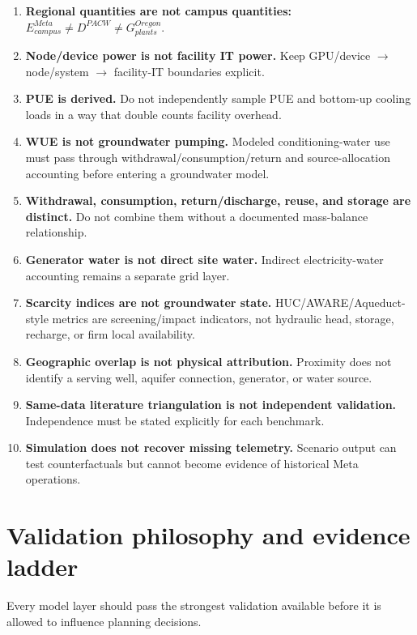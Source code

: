 \documentclass[11pt]{article}
\begin{document}
\begin{enumerate}
\item \textbf{Regional quantities are not campus quantities:}
$E^{Meta}_{campus}\neq D^{PACW}\neq G^{Oregon}_{plants}$.
\item \textbf{Node/device power is not facility IT power.} Keep GPU/device $\rightarrow$ node/system $\rightarrow$ facility-IT boundaries explicit.
\item \textbf{PUE is derived.} Do not independently sample PUE and bottom-up cooling loads in a way that double counts facility overhead.
\item \textbf{WUE is not groundwater pumping.} Modeled conditioning-water use must pass through withdrawal/consumption/return and source-allocation accounting before entering a groundwater model.
\item \textbf{Withdrawal, consumption, return/discharge, reuse, and storage are distinct.} Do not combine them without a documented mass-balance relationship.
\item \textbf{Generator water is not direct site water.} Indirect electricity-water accounting remains a separate grid layer.
\item \textbf{Scarcity indices are not groundwater state.} HUC/AWARE/Aqueduct-style metrics are screening/impact indicators, not hydraulic head, storage, recharge, or firm local availability.
\item \textbf{Geographic overlap is not physical attribution.} Proximity does not identify a serving well, aquifer connection, generator, or water source.
\item \textbf{Same-data literature triangulation is not independent validation.} Independence must be stated explicitly for each benchmark.
\item \textbf{Simulation does not recover missing telemetry.} Scenario output can test counterfactuals but cannot become evidence of historical Meta operations.
\end{enumerate}

\section{Validation philosophy and evidence ladder}

Every model layer should pass the strongest validation available before it is allowed to influence planning decisions.
\end{document}
